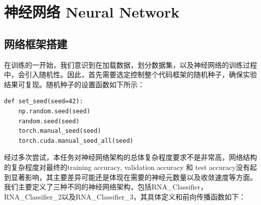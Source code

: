 \documentclass[a4paper,11pt,AutoFakeBold]{ctexart}
\begin{document}
\section{神经网络 Neural Network}

\subsection{网络框架搭建}
在训练的一开始，我们意识到在加载数据，划分数据集，以及神经网络的训练过程中，会引入随机性。因此，首先需要选定控制整个代码框架的随机种子，确保实验结果可复现。随机种子的设置函数如下所示：
\begin{lstlisting}
def set_seed(seed=42):
    np.random.seed(seed)
    random.seed(seed)
    torch.manual_seed(seed)
    torch.cuda.manual_seed_all(seed)
\end{lstlisting}

经过多次尝试，本任务对神经网络架构的总体复杂程度要求不是非常高，网络结构的复杂程度对最终的training accuracy, validation accuracy 和 test accuracy没有起到显著影响，其主要差异可能还是体现在需要的神经元数量以及收敛速度等方面。我们主要定义了三种不同的神经网络架构，包括RNA\_Classifier，RNA\_Classifier\_2以及RNA\_Classifier\_3，其具体定义和前向传播函数如下：
\end{document}
